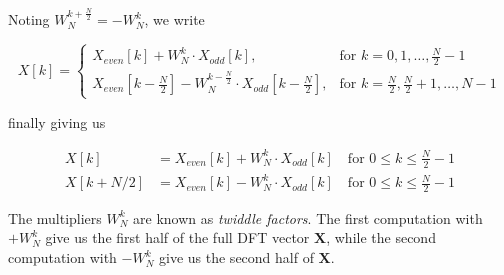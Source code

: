 \documentclass[8pt]{extarticle}
\begin{document}
Noting $W_N^{k +\frac{N}{2}}=-W_{N}^{k}$, we write

\begin{equation*}
    X[k] = 
    \begin{cases}
    X_{even}[k] + W_N^{k} \cdot X_{odd}[k], & \text{for } k = 0,1,\ldots,\frac{N}{2}-1 \\
    X_{even}\left[k-\frac{N}{2}\right] - W_N^{k-\frac{N}{2}} \cdot X_{odd}\left[k-\frac{N}{2}\right], & \text{for } k = \frac{N}{2},\frac{N}{2}+1,\ldots,N-1
\end{cases}
\end{equation*}

finally giving us

\begin{align}
X[k] &= X_{even}[k] + W_N^{k} \cdot X_{odd}[k] \quad \text{for } 0 \leq k \leq \frac{N}{2} - 1 \\
X[k + N/2] &= X_{even}[k] - W_N^{k} \cdot X_{odd}[k] \quad \text{for } 0 \leq k \leq \frac{N}{2} - 1
\label{eq:fft_final}
\end{align}

The multipliers $W_N^k$ are known as \textit{twiddle factors}. The first computation with $+W_N^k$ give us the first half of the full DFT vector $\mathbf{X}$, while the second computation with $-W_N^k$ give us the second half of $\mathbf{X}$.


\newpage

\nocite{*}
\end{document}
